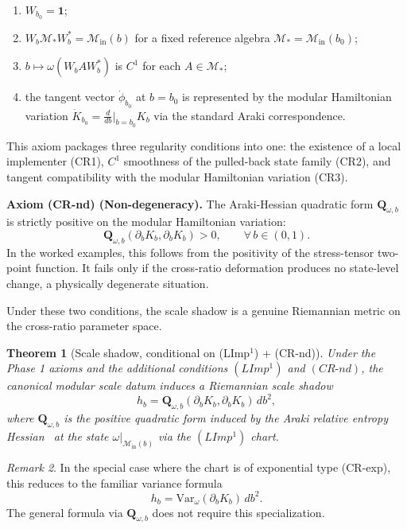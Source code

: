 \documentclass[12pt]{article}
\newtheorem{theorem}{Theorem}[section]
\theoremstyle{definition}
\theoremstyle{remark}
\newtheorem{remark}[theorem]{Remark}
\newcommand{\tightlist}{%
  \setlength{\itemsep}{0pt}\setlength{\parskip}{0pt}}
\begin{document}
\begin{enumerate}
\def\labelenumi{\arabic{enumi}.}
\tightlist
\item
  \(W_{b_0} = \mathbf{1}\);
\item
  \(W_b \mathcal{M}_* W_b^* = \mathcal{M}_{\mathrm{in}}(b)\) for a fixed
  reference algebra \(\mathcal{M}_* = \mathcal{M}_{\mathrm{in}}(b_0)\);
\item
  \(b \mapsto \omega(W_b A W_b^*)\) is \(C^1\) for each
  \(A \in \mathcal{M}_*\);
\item
  the tangent vector \(\dot{\phi}_{b_0}\) at \(b = b_0\) is represented
  by the modular Hamiltonian variation
  \(\dot{K}_{b_0} = \frac{d}{db}|_{b=b_0} K_b\) via the standard Araki
  correspondence.
\end{enumerate}

This axiom packages three regularity conditions into one: the existence
of a local implementer (CR1), \(C^1\) smoothness of the pulled-back
state family (CR2), and tangent compatibility with the modular
Hamiltonian variation (CR3).

\textbf{Axiom (CR-nd) (Non-degeneracy).} The Araki-Hessian quadratic
form \(\mathbf{Q}_{\omega,b}\) is strictly positive on the modular
Hamiltonian variation: \[
\mathbf{Q}_{\omega,b}(\partial_b K_b, \partial_b K_b) > 0,
\qquad \forall\, b \in (0,1).
\]
In the worked examples, this follows from the positivity of the
stress-tensor two-point function. It fails only if the cross-ratio
deformation produces no state-level change, a physically degenerate
situation.

Under these two conditions, the scale shadow is a genuine Riemannian
metric on the cross-ratio parameter space.

\begin{theorem}[Scale shadow, conditional on \textnormal{(LImp\(^1\))} +
\textnormal{(CR-nd)}]\label{thm:5.3}
Under the Phase 1 axioms and the additional conditions
\((LImp^1)\) and \((CR\text{-}nd)\), the canonical modular scale datum
induces a Riemannian scale shadow \[
h_b = \mathbf{Q}_{\omega,b}(\partial_b K_b, \partial_b K_b)\, db^2,
\] where \(\mathbf{Q}_{\omega,b}\) is the positive quadratic form
induced by the Araki relative entropy Hessian~\cite{Araki1976} at the state
\(\omega|_{\mathcal{M}_{\mathrm{in}}(b)}\) via the \((LImp^1)\) chart.
\end{theorem}

\begin{remark}
In the special case where the chart is of exponential
type (CR-exp), this reduces to the familiar variance formula \[
h_b = \mathrm{Var}_\omega(\partial_b K_b)\, db^2.
\] The general formula via \(\mathbf{Q}_{\omega,b}\) does not require
this specialization.
\end{remark}
\end{document}
